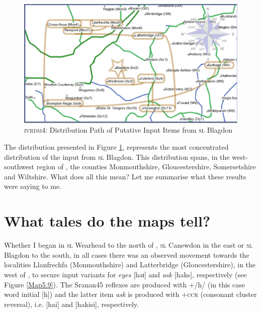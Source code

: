 \begin{figure}
\includegraphics[width=\textwidth, keepaspectratio] {figures/ivrdm4.pdf}
\addtocounter{figure}{-1}\renewcommand{\thefigure}{\arabic{figure}.8b}
\caption {\textsc{ivrdm4}: Distribution Path of Putative Input Items from \textsc{sl} Blagdon} 
\label{Map5.8b}
\end{figure}

The distribution presented in Figure \ref{Map5.8b}, represents the most concentrated distribution of the input from \textsc{sl} Blagdon. This distribution spans, in the west-southwest region of , the counties Monmouthshire, Gloucestershire, Somersetshire and Wiltshire. What does all this mean? Let me summarise what these results were saying to me.

\section{What tales do the maps tell?}
Whether I began in \textsc{sl} Wearhead to the north of , \textsc{sl} Canewdon in the east or \textsc{sl} Blagdon to the south, in all cases there was an observed movement towards the localities Llanfrechfa (Monmouthshire) and Latterbridge (Gloucestershire), in the west of , to secure input variants for \emph{eyes } [həɪ] and \emph{ask} [haks], respectively (see Figure \ref{Map5.9}). The Sranan45 reflexes are produced with +/h/ (in this case word initial [h]) and the latter item \emph{ask} is produced with +\textsc{ccr} (consonant cluster reversal), i.e. [hai] and [hakisi], respectively.


